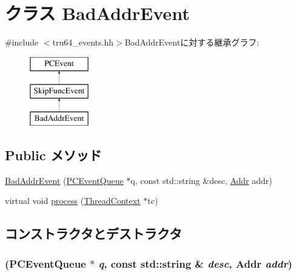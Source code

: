 \hypertarget{classBadAddrEvent}{
\section{クラス BadAddrEvent}
\label{classBadAddrEvent}
}


{\ttfamily \#include $<$tru64\_\-events.hh$>$}BadAddrEventに対する継承グラフ:\begin{figure}[H]
\begin{center}
\leavevmode
\includegraphics[height=3cm]{classBadAddrEvent}
\end{center}
\end{figure}
\subsection*{Public メソッド}
\begin{DoxyCompactItemize}
\item 
\hyperlink{classBadAddrEvent_a6fa14ad6f10a0146f46120b72c5cd500}{BadAddrEvent} (\hyperlink{classPCEventQueue}{PCEventQueue} $\ast$q, const std::string \&desc, \hyperlink{base_2types_8hh_af1bb03d6a4ee096394a6749f0a169232}{Addr} addr)
\item 
virtual void \hyperlink{classBadAddrEvent_ad66a9d5ec7cfe597b848a17c0df5cc28}{process} (\hyperlink{classThreadContext}{ThreadContext} $\ast$tc)
\end{DoxyCompactItemize}


\subsection{コンストラクタとデストラクタ}
\hypertarget{classBadAddrEvent_a6fa14ad6f10a0146f46120b72c5cd500}{
\subsubsection[{BadAddrEvent}]{ ({\bf PCEventQueue} $\ast$ {\em q}, \/  const std::string \& {\em desc}, \/  {\bf Addr} {\em addr})}}
\label{classBadAddrEvent_a6fa14ad6f10a0146f46120b72c5cd500}




